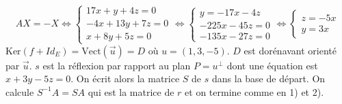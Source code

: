 {{\begin{enumerate}
$$AX=-X\Leftrightarrow\left\{
\begin{array}{l}
17x+y+4z=0\\
-4x+13y+7z=0\\
x+8y+5z=0
\end{array}
\right.\Leftrightarrow\left\{
\begin{array}{l}
y=-17x-4z\\
-225x-45z=0\\
-135x-27z=0
\end{array}
\right.\Leftrightarrow\left\{
\begin{array}{l}
z=-5x\\
y=3x
\end{array}\right.$$
$\mbox{Ker}(f+Id_E)=\mbox{Vect}(\overrightarrow{u})=D$ où $u=(1,3,-5)$. $D$ est dorénavant orienté par $\overrightarrow{u}$.
$s$ est la réflexion par rapport au plan $P=u^\bot$ dont une équation est $x+3y-5z=0$.
On écrit alors la matrice $S$ de $s$ dans la base de départ. On calcule $S^{-1}A=SA$ qui est la matrice de $r$ et on termine comme en 1) et 2).
\end{enumerate}}
}
